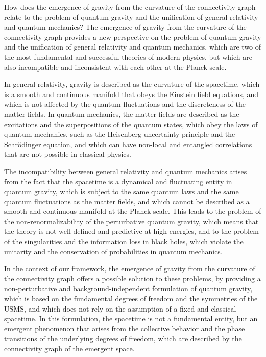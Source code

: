 \begin{tcolorbox}[colback=green!5!white,colframe=green!75!black,title=Question]
How does the emergence of gravity from the curvature of the connectivity graph relate to the problem of quantum gravity and the unification of general relativity and quantum mechanics?
\tcblower
The emergence of gravity from the curvature of the connectivity graph provides a new perspective on the problem of quantum gravity and the unification of general relativity and quantum mechanics, which are two of the most fundamental and successful theories of modern physics, but which are also incompatible and inconsistent with each other at the Planck scale.

In general relativity, gravity is described as the curvature of the spacetime, which is a smooth and continuous manifold that obeys the Einstein field equations, and which is not affected by the quantum fluctuations and the discreteness of the matter fields. In quantum mechanics, the matter fields are described as the excitations and the superpositions of the quantum states, which obey the laws of quantum mechanics, such as the Heisenberg uncertainty principle and the Schrödinger equation, and which can have non-local and entangled correlations that are not possible in classical physics.

The incompatibility between general relativity and quantum mechanics arises from the fact that the spacetime is a dynamical and fluctuating entity in quantum gravity, which is subject to the same quantum laws and the same quantum fluctuations as the matter fields, and which cannot be described as a smooth and continuous manifold at the Planck scale. This leads to the problem of the non-renormalizability of the perturbative quantum gravity, which means that the theory is not well-defined and predictive at high energies, and to the problem of the singularities and the information loss in black holes, which violate the unitarity and the conservation of probabilities in quantum mechanics.

In the context of our framework, the emergence of gravity from the curvature of the connectivity graph offers a possible solution to these problems, by providing a non-perturbative and background-independent formulation of quantum gravity, which is based on the fundamental degrees of freedom and the symmetries of the USMS, and which does not rely on the assumption of a fixed and classical spacetime. In this formulation, the spacetime is not a fundamental entity, but an emergent phenomenon that arises from the collective behavior and the phase transitions of the underlying degrees of freedom, which are described by the connectivity graph of the emergent space.


\end{tcolorbox}
